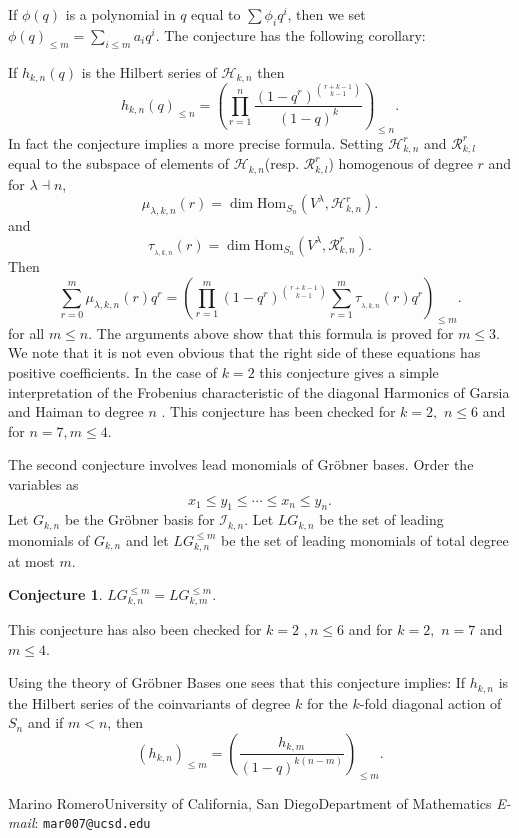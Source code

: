 \documentclass[12pt]{article}%
\newtheorem{conjecture}[theorem]{Conjecture}
\begin{document}
If $\phi(q)$ is a polynomial in $q$ equal to $\sum\phi_{i}q^{i}$, then we set
$\phi(q)_{\leq m}=\sum_{i\leq m}a_{i}q^{i}$. The conjecture has the following corollary:

If $h_{k,n}(q)$ is the Hilbert series of $\mathcal{H}_{k,n}$ then%
\[
h_{k,n}(q)_{\leq n}=\left(  \prod_{r=1}^{n}\frac{(1-q^{r})^{\binom{r+k-1}%
{k-1}}}{(1-q)^{k}}\right)  _{\leq n}.
\]
In fact the conjecture implies a more precise formula. Setting $\mathcal{H}%
_{k,n}^{r}$ and $\mathcal{R}_{k,l}^{r}$ equal to the subspace of elements of
$\mathcal{H}_{k,n}$(resp. $\mathcal{R}_{k,l}^{r}$) homogenous of degree $r$
and for $\lambda\dashv n$,
\[
\mu_{\lambda,k,n}(r)=\dim\mathrm{Hom}_{S_{n}}(V^{\lambda},\mathcal{H}%
_{k,n}^{r}).
\]
and
\[
\tau_{_{\lambda,k,n}}(r)=\dim\mathrm{Hom}_{S_{n}}(V^{\lambda},\mathcal{R}%
_{k,n}^{r}).
\]
Then%
\[
\sum_{r=0}^{m}\mu_{\lambda,k,n}(r)q^{r}=\left(  \prod_{r=1}^{m}(1-q^{r}%
)^{\binom{r+k-1}{k-1}}\sum_{r=1}^{m}\tau_{_{\lambda,k,n}}(r)q^{r}\right)
_{\leq m}.
\]
for all $m\leq n$. The arguments above show that this formula is proved for
$m\leq3$. We note that it is not even obvious that the right side of these
equations has positive coefficients. In the case of $k=2$ this conjecture
gives a simple interpretation of the Frobenius characteristic of the diagonal
Harmonics of Garsia and Haiman to degree $n$ \cite{qLagrange}. This conjecture
has been checked for $k=2,$ $n\leq6$ and for $n=7,m\leq4$.

The second conjecture involves lead monomials of Gr\"{o}bner bases. Order the
variables as
\[
x_{1}\leq y_{1}\leq\cdots\leq x_{n}\leq y_{n}.
\]
Let $G_{k,n}$ be the Gr\"{o}bner basis for $\mathcal{I}_{k,n}$. Let $LG_{k,n}$
be the set of leading monomials of $G_{k,n}$ and let $LG_{k,n}^{\leq m}$ be
the set of leading monomials of total degree at most $m$.

\begin{conjecture}
$LG_{k,n}^{\leq m}=LG_{k,m}^{\leq m}.$
\end{conjecture}

This conjecture has also been checked for $k=2$ $,n\leq6$ and for $k=2,$ $n=7$
and $m \leq4$.

Using the theory of Gr\"{o}bner Bases one sees that this conjecture implies:
If $h_{k,n}$ is the Hilbert series of the coinvariants of degree $k$ for the
$k$-fold diagonal action of $S_{n}$ and if $m < n$, then
\[
\left(  h_{k,n}\right)  _{\leq m}=\left(  \frac{h_{k,m}}{(1-q)^{k(n-m)}%
}\right)  _{\leq m}.
\]





{\small  \noindent\newline Marino Romero\newline University of California, San
Diego\newline Department of Mathematics \newline\emph{E\--mail}: \texttt{mar007@ucsd.edu} 
}
\end{document}
